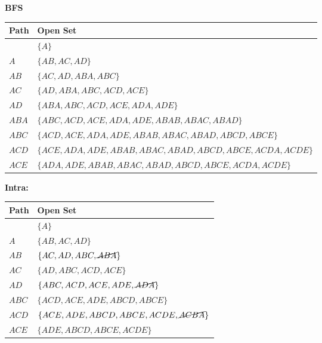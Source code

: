 \begin{example} \textbf{BFS}
    \begin{center}
        \begin{tabular}{ll}
        \toprule
        \textbf{Path} & \textbf{Open Set} \\
        \midrule
         & $\{A\}$ \\
        $A$ & $\{AB, AC, AD\}$ \\
        $AB$ & $\{AC, AD, ABA, ABC\}$ \\
        $AC$ & $\{AD, ABA, ABC, ACD, ACE\}$ \\
        $AD$ & $\{ABA, ABC, ACD, ACE, ADA, ADE\}$ \\
        $ABA$ & $\{ABC, ACD, ACE, ADA, ADE, ABAB, ABAC, ABAD\}$ \\
        $ABC$ & $\{ACD, ACE, ADA, ADE, ABAB, ABAC, ABAD, ABCD, ABCE\}$ \\
        $ACD$ & $\{ACE, ADA, ADE, ABAB, ABAC, ABAD, ABCD, ABCE, ACDA, ACDE\}$ \\
        $ACE$ & $\{ADA, ADE, ABAB, ABAC, ABAD, ABCD, ABCE, ACDA, ACDE\}$ \\
        \bottomrule
        \end{tabular}
    \end{center}
    \vspace{1em}

    \textbf{Intra:}
    \begin{center}
        \begin{tabular}{ll}
        \toprule
        \textbf{Path} & \textbf{Open Set} \\
        \midrule
         & $\{A\}$ \\
        $A$ & $\{AB, AC, AD\}$ \\
        $AB$ & $\{AC, AD, ABC, \cancel{ABA}\}$ \\
        $AC$ & $\{AD, ABC, ACD, ACE\}$ \\
        $AD$ & $\{ABC, ACD, ACE, ADE, \cancel{ADA}\}$ \\
        $ABC$ & $\{ACD, ACE, ADE, ABCD, ABCE\}$ \\
        $ACD$ & $\{ACE, ADE, ABCD, ABCE, ACDE, \cancel{ACBA}\}$ \\
        $ACE$ & $\{ADE, ABCD, ABCE, ACDE\}$ \\
        \bottomrule
        \end{tabular}
    \end{center}
    \vspace{1em}


\end{example}
